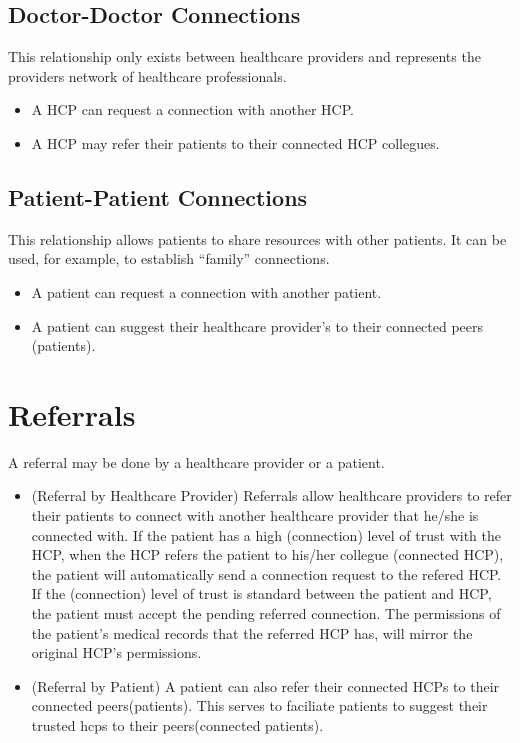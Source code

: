 \subsection{Doctor-Doctor Connections}
This relationship only exists between healthcare providers and represents the providers network of healthcare professionals.
\begin{itemize}
\item A HCP can request a connection with another HCP. 
\item A HCP may refer their patients to their connected HCP collegues. 
\end{itemize} 

\subsection{Patient-Patient Connections}
This relationship allows patients to share resources with other patients. It can be used, for example, to establish ``family'' connections.
\begin{itemize}
\item A patient can request a connection with another patient. 
\item A patient can suggest their healthcare provider's to their connected peers (patients).
\end{itemize} 

\section{Referrals}
A referral may be done by a healthcare provider or a patient.

\begin{itemize}
\item (Referral by Healthcare Provider) Referrals allow healthcare providers to refer their patients to connect with another healthcare provider that he/she is connected with. If the patient has a high (connection) level of trust with the HCP, when the HCP refers the patient to his/her collegue (connected HCP), the patient will automatically send a connection request to the refered HCP. If the (connection) level of trust is standard between the patient and HCP, the patient must accept the pending referred connection. The permissions of the patient's medical records that the referred HCP has, will mirror the original HCP's permissions.

\item (Referral by Patient) A patient can also refer their connected HCPs to their connected peers(patients). This serves to faciliate patients to suggest their trusted hcps to their peers(connected patients).
\end{itemize} 

